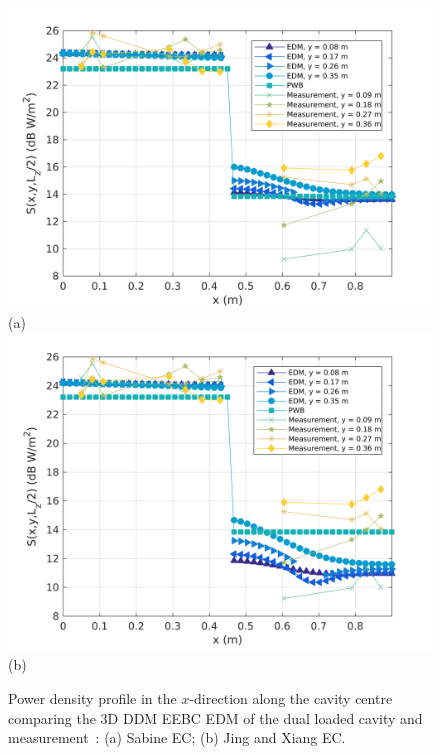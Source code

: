 \documentclass[a4paper]{article}
\numberwithin{equation}{section}
\begin{document}
\begin{figure}[ht]
\begin{center}
\includegraphics[width=0.6\linewidth]{figures/DDM-EEBC_3D_DL_PowerDensityProfileXMeas}\\
{\footnotesize (a)}\\
\vspace{2mm}
\includegraphics[width=0.6\linewidth]{figures/DDM-EEBC_3D_DL_PowerDensityProfileXMeas_JX}\\
{\footnotesize (b)}\\
\vspace{-2mm}
\caption{\label{fg:measprofsdl} Power density profile in the $x$-direction along the cavity centre comparing
the 3D DDM EEBC EDM of the dual loaded cavity and measurement~\citep{Flintoft2017b}: (a) Sabine EC; (b) Jing and Xiang EC.}
\end{center}
\end{figure}
\end{document}
